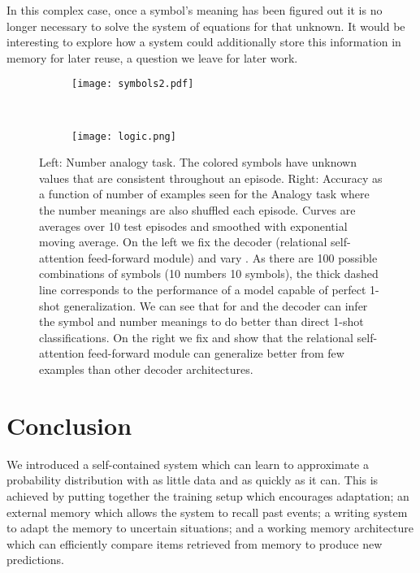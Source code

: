 \documentclass{article} \usepackage{iclr2019_conference,times}
\begin{document}
In this complex case, once a symbol's meaning has been figured out it is no longer necessary to solve the system of equations for that unknown. It would be interesting to explore how a system could additionally store this information in memory for later reuse, a question we leave for later work.

\begin{figure}[ht]
    \centering
    \begin{subfigure}[c]{0.3\textwidth}
        \texttt{[image: symbols2.pdf]}
        \label{fig:symbols}
    \end{subfigure}
    ~ \begin{subfigure}[c]{0.68\textwidth}
        \texttt{[image: logic.png]}
        \label{fig:logic}
    \end{subfigure}
    \caption{Left: Number analogy task. The colored symbols have unknown values that are consistent throughout an episode. Right: Accuracy as a function of number of examples seen for the Analogy task where the number meanings are also shuffled each episode. Curves are averages over 10 test episodes and smoothed with exponential moving average. On the left we fix the decoder (relational self-attention feed-forward module) and vary . As there are 100 possible combinations of symbols (10 numbers  10 symbols), the thick dashed line corresponds to the performance of a model capable of perfect 1-shot generalization. We can see that for  and  the decoder can infer the symbol and number meanings to do better than direct 1-shot classifications. On the right we fix  and show that the relational self-attention feed-forward module can generalize better from few examples than other decoder architectures.}
    \label{fig:analogy}
\end{figure}




\section{Conclusion}

We introduced a self-contained system which can learn to approximate a probability distribution with as little data and as quickly as it can. This is achieved by putting together the training setup which encourages adaptation; an external memory which allows the system to recall past events; a writing system to adapt the memory to uncertain situations; and a working memory architecture which can efficiently compare items retrieved from memory to produce new predictions.
\end{document}
